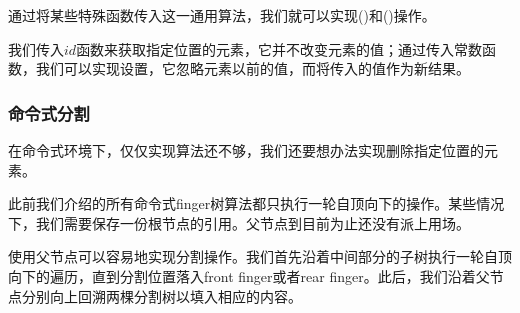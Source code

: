 \documentclass[UTF8]{article}
\begin{document}
通过将某些特殊函数传入这一通用算法，我们就可以实现()和()操作。

\begin{algorithmic}
  \State \Return {}
\EndFunction
\Statex
{}
  \State \Return {}
\EndFunction
\end{algorithmic}

我们传入$id$函数来获取指定位置的元素，它并不改变元素的值；通过传入常数函数，我们可以实现设置，它忽略元素以前的值，而将传入的值作为新结果。

\subsubsection{命令式分割}

在命令式环境下，仅仅实现算法还不够，我们还要想办法实现删除指定位置的元素。

此前我们介绍的所有命令式finger树算法都只执行一轮自顶向下的操作。某些情况下，我们需要保存一份根节点的引用。父节点到目前为止还没有派上用场。

使用父节点可以容易地实现分割操作。我们首先沿着中间部分的子树执行一轮自顶向下的遍历，直到分割位置落入front finger或者rear finger。此后，我们沿着父节点分别向上回溯两棵分割树以填入相应的内容。
\end{document}
